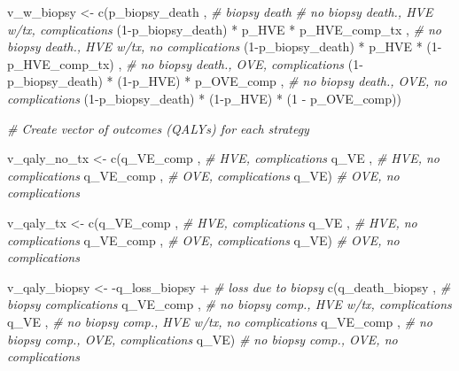 \documentclass[
]{article}
\newenvironment{Shaded}{\begin{snugshade}}{\end{snugshade}}
\newcommand{\CommentTok}[1]{\textcolor[rgb]{0.56,0.35,0.01}{\textit{#1}}}
\newcommand{\DecValTok}[1]{\textcolor[rgb]{0.00,0.00,0.81}{#1}}
\newcommand{\FunctionTok}[1]{\textcolor[rgb]{0.00,0.00,0.00}{#1}}
\newcommand{\NormalTok}[1]{#1}
\newcommand{\OtherTok}[1]{\textcolor[rgb]{0.56,0.35,0.01}{#1}}
\newcommand{\SpecialCharTok}[1]{\textcolor[rgb]{0.00,0.00,0.00}{#1}}
\begin{document}
\begin{Shaded}
\begin{Highlighting}[]
\NormalTok{v\_w\_biopsy }\OtherTok{\textless{}{-}} \FunctionTok{c}\NormalTok{(p\_biopsy\_death                   ,  }\CommentTok{\# biopsy death}
               \CommentTok{\# no biopsy death.,   HVE w/tx,        complications}
\NormalTok{               (}\DecValTok{1}\SpecialCharTok{{-}}\NormalTok{p\_biopsy\_death)   }\SpecialCharTok{*}\NormalTok{    p\_HVE  }\SpecialCharTok{*}\NormalTok{    p\_HVE\_comp\_tx  ,  }
               \CommentTok{\# no biopsy death.,   HVE w/tx,     no complications}
\NormalTok{               (}\DecValTok{1}\SpecialCharTok{{-}}\NormalTok{p\_biopsy\_death)   }\SpecialCharTok{*}\NormalTok{    p\_HVE  }\SpecialCharTok{*}\NormalTok{ (}\DecValTok{1}\SpecialCharTok{{-}}\NormalTok{p\_HVE\_comp\_tx) ,  }
               \CommentTok{\# no biopsy death.,        OVE,        complications}
\NormalTok{               (}\DecValTok{1}\SpecialCharTok{{-}}\NormalTok{p\_biopsy\_death)   }\SpecialCharTok{*}\NormalTok{ (}\DecValTok{1}\SpecialCharTok{{-}}\NormalTok{p\_HVE) }\SpecialCharTok{*}\NormalTok{      p\_OVE\_comp   ,  }
               \CommentTok{\# no biopsy death.,        OVE,     no complications}
\NormalTok{               (}\DecValTok{1}\SpecialCharTok{{-}}\NormalTok{p\_biopsy\_death)   }\SpecialCharTok{*}\NormalTok{ (}\DecValTok{1}\SpecialCharTok{{-}}\NormalTok{p\_HVE) }\SpecialCharTok{*}\NormalTok{ (}\DecValTok{1} \SpecialCharTok{{-}}\NormalTok{ p\_OVE\_comp))      }
  
\CommentTok{\# Create vector of outcomes (QALYs) for each strategy }
  
\NormalTok{v\_qaly\_no\_tx  }\OtherTok{\textless{}{-}} \FunctionTok{c}\NormalTok{(q\_VE\_comp ,          }\CommentTok{\# HVE, complications}
\NormalTok{                   q\_VE      ,          }\CommentTok{\# HVE, no complications}
\NormalTok{                   q\_VE\_comp ,          }\CommentTok{\# OVE, complications}
\NormalTok{                   q\_VE)                }\CommentTok{\# OVE, no complications}
  
\NormalTok{v\_qaly\_tx     }\OtherTok{\textless{}{-}} \FunctionTok{c}\NormalTok{(q\_VE\_comp ,          }\CommentTok{\# HVE, complications}
\NormalTok{                   q\_VE      ,          }\CommentTok{\# HVE, no complications}
\NormalTok{                   q\_VE\_comp ,          }\CommentTok{\# OVE, complications}
\NormalTok{                   q\_VE)                }\CommentTok{\# OVE, no complications}
  
  
\NormalTok{v\_qaly\_biopsy }\OtherTok{\textless{}{-}} \SpecialCharTok{{-}}\NormalTok{q\_loss\_biopsy     }\SpecialCharTok{+}   \CommentTok{\# loss due to biopsy}
                  \FunctionTok{c}\NormalTok{(q\_death\_biopsy  ,   }\CommentTok{\# biopsy complications}
\NormalTok{                    q\_VE\_comp       ,   }\CommentTok{\# no biopsy comp., HVE w/tx, complications }
\NormalTok{                    q\_VE            ,   }\CommentTok{\# no biopsy comp., HVE w/tx, no complications}
\NormalTok{                    q\_VE\_comp       ,   }\CommentTok{\# no biopsy comp., OVE, complications}
\NormalTok{                    q\_VE)               }\CommentTok{\# no biopsy comp., OVE, no complications}
  

\end{Highlighting}
\end{Shaded}
\end{document}

